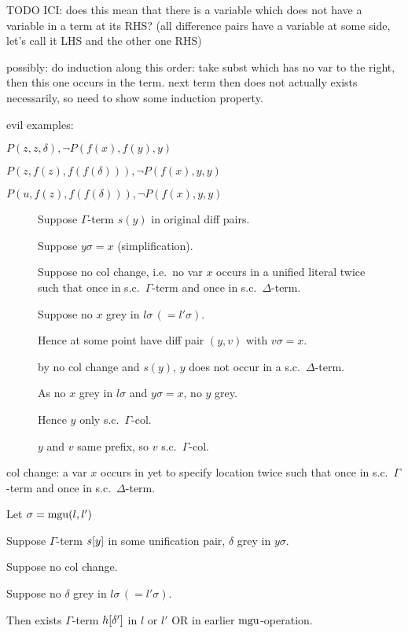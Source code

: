 \documentclass[,%
	paper=a4,%
	DIV11, %
	twoside=false,%
	liststotoc,
	bibtotoc,
	draft=false,%
	numbers=noendperiod
]{scrartcl}
\begin{document}
{TODO ICI: does this mean that there is a variable which does not have a variable in a term at its RHS? }
(all difference pairs have a variable at some side, let's call it LHS and the other one RHS)

{possibly: do induction along this order: take subst which has no var to the right, then this one occurs in the term. next term then does not actually exists necessarily, so need to show some induction property.}


evil examples:

$P(z, z, \delta), \lnot P(f(x), f(y), y)$

$P(z, f(z), f(f(\delta))), \lnot P(f(x), y, y)$

$P(u, f(z), f(f(\delta))), \lnot P(f(x), y, y)$

\begin{figure}
	\begin{clemma}
		Suppose $\Gamma$-term $s(y)$ in original diff pairs.

		Suppose $y\sigma = x$ (simplification).

		Suppose no col change, i.e.\ no var $x$ occurs in a unified literal twice such that once in s.c.\ $\Gamma$-term and once in s.c.\ $\Delta$-term.

		Suppose no $x$ grey in $l\sigma \, ( = l'\sigma )$.

		Hence at some point have diff pair $(y, v)$ with $v\sigma = x$.

		by no col change and $s(y)$, $y$ does not occur in a s.c.\ $\Delta$-term.

		As no $x$ grey in $l\sigma$ and $y\sigma = x$, no $y$ grey.

		Hence $y$ only s.c.\ $\Gamma$-col.

		$y$ and $v$ same prefix, so $v$ s.c.\ $\Gamma$-col.

	\end{clemma}


\end{figure}

\begin{defi}
	col change: a var $x$ occurs in yet to specify location twice such that once in s.c.\ $\Gamma$-term and once in s.c.\ $\Delta$-term.
\end{defi}

\newcommand{\epsilondelta}{\varepsilon\occ\delta}
\newcommand{\epsilonx}{\varepsilon\occ x}

\begin{clemma}
	Let $\sigma = \operatorname{mgu}(l, l')$

	Suppose $\Gamma$-term $s[y]$ in some unification pair, $\delta$ grey in $y\sigma$.

	Suppose no col change.

	Suppose no $\delta$ grey in $l\sigma \, ( = l'\sigma )$.

	Then exists $\Gamma$-term $h[\delta']$ in $l$ or $l'$ OR in earlier $\operatorname{mgu}$-operation.

\end{clemma}
\end{document}
